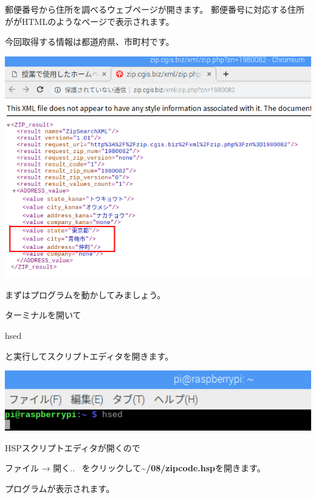 \documentclass[a4paper,12pt,dvipdfmx]{jarticle}
\begin{document}
\bigskip


\bigskip

郵便番号から住所を調べるウェブページが開きます。
郵便番号に対応する住所ががHTMLのようなページで表示されます。

今回取得する情報は都道府県、市町村です。



\begin{center}
\includegraphics[width=15.492cm]{textbook-img055.png}

\end{center}
\clearpage
まずはプログラムを動かしてみましょう。

ターミナルを開いて

hsed

と実行してスクリプトエディタを開きます。



\begin{center}
\includegraphics[width=17.057cm]{textbook-img013.png}

\end{center}
HSPスクリプトエディタが開くので

ファイル → 開く..
\ をクリックして\textbf{{\textasciitilde}/08/zipcode.hsp}を開きます。

プログラムが表示されます。
\end{document}
